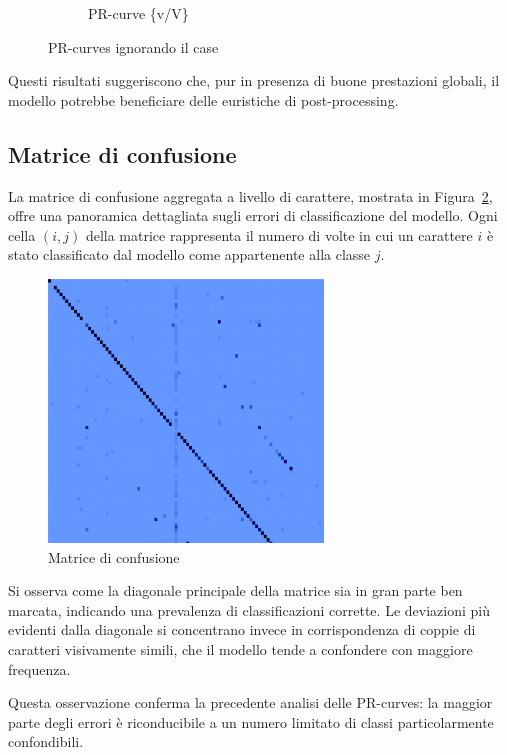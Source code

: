 \begin{figure}[htbp]
\begin{subfigure}[t]{0.32\textwidth}
        \caption{PR-curve \{v/V\}}
    \end{subfigure}
    \caption{PR-curves ignorando il case}
    \label{fig:pr-ignore}
\end{figure}

Questi risultati suggeriscono che, pur in presenza di buone prestazioni globali, il modello potrebbe beneficiare delle euristiche di post-processing.


\subsection{Matrice di confusione}
La matrice di confusione aggregata a livello di carattere, mostrata in Figura~\ref{fig:confusion_matrix}, offre una panoramica dettagliata sugli errori di classificazione del modello. Ogni cella \((i, j)\) della matrice rappresenta il numero di volte in cui un carattere \(i\) è stato classificato dal modello come appartenente alla classe \(j\).

\begin{figure}[htbp]
    \centering
    \includegraphics[width=0.65\textwidth]{images/confusion_matrix.png}
    \caption{Matrice di confusione}
    \label{fig:confusion_matrix}
\end{figure}

Si osserva come la diagonale principale della matrice sia in gran parte ben marcata, indicando una prevalenza di classificazioni corrette. Le deviazioni più evidenti dalla diagonale si concentrano invece in corrispondenza di coppie di caratteri visivamente simili, che il modello tende a confondere con maggiore frequenza.

Questa osservazione conferma la precedente analisi delle PR-curves: la maggior parte degli errori è riconducibile a un numero limitato di classi particolarmente confondibili.

